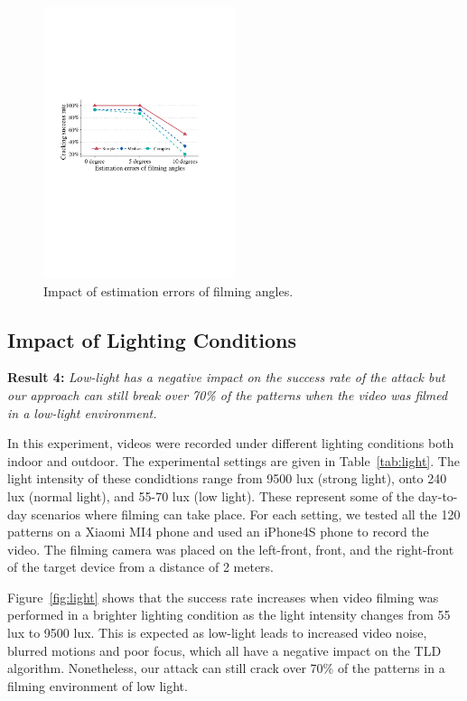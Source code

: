     \begin{figure}[!t]
        \centering
        \includegraphics[width=0.5\textwidth]{fig/15.pdf}
        \caption{Impact of estimation errors of filming angles.}
        \label{fig:fig15}
    \end{figure}


    \subsection{Impact of Lighting Conditions \label{sec:light}}
    \noindent \textbf{Result 4:} \emph{Low-light has a negative impact on the success rate of the attack but our approach can still break over 70\% of the patterns when the video was filmed in a low-light environment.}

    In this experiment, videos were recorded under different lighting conditions both indoor and outdoor.
    The experimental settings are given in  Table~\ref{tab:light}.
    The light intensity of these condidtions range from 9500
    lux (strong light), onto 240 lux (normal light), and 55-70 lux (low light).
    These represent some of the day-to-day scenarios where filming can
    take place. For each setting, we tested all the 120 patterns on a Xiaomi MI4 phone and used
    an iPhone4S phone to record the video. The filming camera was placed on the
    left-front, front, and the right-front of the target device from a distance
    of 2 meters.


    Figure~\ref{fig:light} shows that the success rate increases when video filming was performed in a brighter lighting condition as the light intensity
    changes from 55 lux to 9500 lux. This is expected as low-light leads to
    increased video noise, blurred motions and poor focus, which all have a
    negative impact on the TLD algorithm. Nonetheless, our attack
    can still crack over 70\% of the patterns in a filming
    environment of low light.


